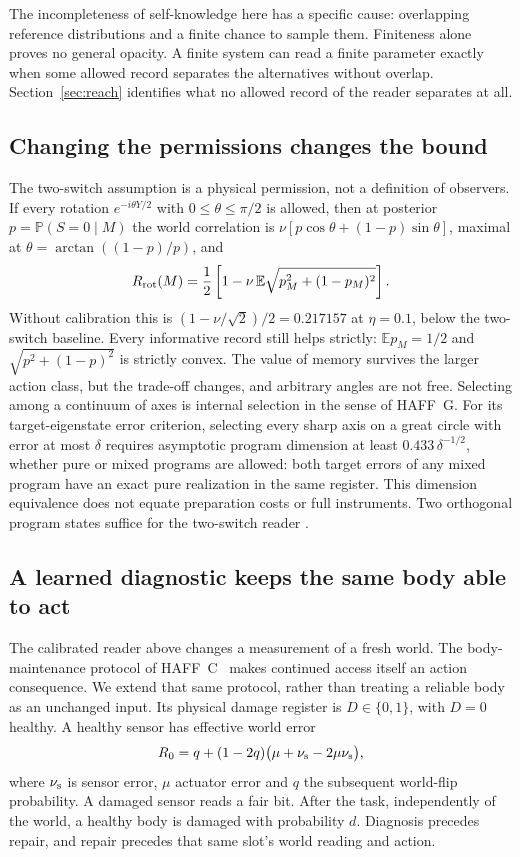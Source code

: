 \documentclass[11pt,a4paper]{article}
\newcommand{\E}{\mathbb E}
\newcommand{\Prb}{\mathbb P}
\begin{document}
The incompleteness of self-knowledge here has a specific cause: overlapping reference distributions and a finite chance to sample them. Finiteness alone proves no general opacity. A finite system can read a finite parameter exactly when some allowed record separates the alternatives without overlap. Section~\ref{sec:reach} identifies what no allowed record of the reader separates at all.

\subsection{Changing the permissions changes the bound}\label{subsec:continuous}

The two-switch assumption is a physical permission, not a definition of observers. If every rotation $e^{-i\theta Y/2}$ with $0\le\theta\le\pi/2$ is allowed, then at posterior $p=\Prb(S=0\mid M)$ the world correlation is $\nu[p\cos\theta+(1-p)\sin\theta]$, maximal at $\theta=\arctan((1-p)/p)$, and
\begin{equation}\label{eq:continuous}
 R_{\rm rot}(M)=\frac12\left[1-\nu\,\E\sqrt{p_M^2+(1-p_M)^2}\right].
\end{equation}
Without calibration this is $(1-\nu/\sqrt2)/2=0.217157$ at $\eta=0.1$, below the two-switch baseline. Every informative record still helps strictly: $\E p_M=1/2$ and $\sqrt{p^2+(1-p)^2}$ is strictly convex. The value of memory survives the larger action class, but the trade-off changes, and arbitrary angles are not free. Selecting among a continuum of axes is internal selection in the sense of HAFF~G. For its target-eigenstate error criterion, selecting every sharp axis on a great circle with error at most $\delta$ requires asymptotic program dimension at least $0.433\,\delta^{-1/2}$, whether pure or mixed programs are allowed: both target errors of any mixed program have an exact pure realization in the same register. This dimension equivalence does not equate preparation costs or full instruments. Two orthogonal program states suffice for the two-switch reader \cite{HAFFG}.

\subsection{A learned diagnostic keeps the same body able to act}
\label{subsec:bodycal}

The calibrated reader above changes a measurement of a fresh world. The body-maintenance protocol of HAFF~C~\cite{HAFFC} makes continued access itself an action consequence. We extend that same protocol, rather than treating a reliable body as an unchanged input. Its physical damage register is $D\in\{0,1\}$, with $D=0$ healthy. A healthy sensor has effective world error
\[
 R_0=q+(1-2q)\bigl(\mu+\nu_{\rm s}-2\mu\nu_{\rm s}\bigr),
\]
where $\nu_{\rm s}$ is sensor error, $\mu$ actuator error and $q$ the subsequent world-flip probability. A damaged sensor reads a fair bit. After the task, independently of the world, a healthy body is damaged with probability $d$. Diagnosis precedes repair, and repair precedes that same slot's world reading and action.
\end{document}
